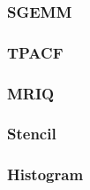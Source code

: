 \subsubsection{SGEMM}

\subsubsection{TPACF}

\subsubsection{MRIQ}

\subsubsection{Stencil}

\subsubsection{Histogram}

